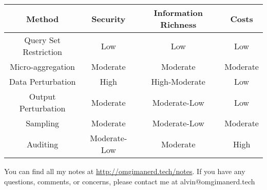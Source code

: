 \documentclass{math}
\begin{document}
\begin{center}
  \begin{tabular}{|c|ccc|}
    \hline
    Method & Security & Information Richness & Costs \\ \hline \hline
    Query Set Restriction & Low & Low & Low \\
    Micro-aggregation & Moderate & Moderate & Moderate \\
    Data Perturbation & High & High-Moderate & Low \\
    Output Perturbation & Moderate & Moderate-Low & Low \\
    Sampling & Moderate & Moderate-Low & Moderate \\
    Auditing & Moderate-Low & Moderate & High \\
    \hline
  \end{tabular}
\end{center}

\begin{center}
  You can find all my notes at \url{http://omgimanerd.tech/notes}. If you have
  any questions, comments, or concerns, please contact me at
  alvin@omgimanerd.tech
\end{center}
\end{document}
